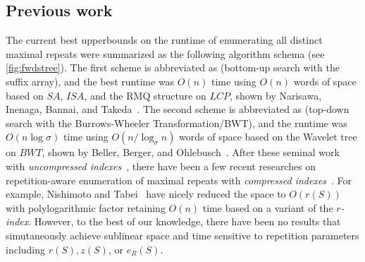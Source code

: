 \subsection{Previous work} 
The current best upperbounds on the runtime of enumerating all distinct  maximal repeats were summarized as the following algorithm schema (see \cref{fig:fwdstree}).
The first scheme is abbreviated as \BUSA{} (bottom-up search with the suffix array),  and the best runtime was $O(n)$ time using $O(n)$ words of space based on $SA$, $ISA$, and the RMQ structure on $LCP$, shown by Narisawa, Inenaga, Bannai, and Takeda~\cite{narisawa2007efficient}. 
The second scheme is abbreviated as \TDBW{} (top-down search with the Burrows-Wheeler Transformation/BWT), and the runtime was $O(n \log\sigma)$ time using $O(n/\log_\sigma n)$ words of space based on the Wavelet tree on $BWT$, shown by Beller, Berger, and Ohlebusch~\cite{beller:berger2012space:efficient:bbo}.
After these seminal work with \textit{uncompressed indexes}~\cite{narisawa2007efficient,beller:berger2012space:efficient:bbo}, there have been a few recent researches on repetition-aware enumeration of maximal repeats with \textit{compressed indexes}~\cite{belazzougui2020linear,nishimoto:cpm2021enum}. For example, Nishimoto and Tabei~\cite{nishimoto:cpm2021enum} have nicely reduced the space to $O(r(S))$ with polylogarithmic factor retaining $O(n)$ time based on a variant of the \textit{$r$-index}. However, to the best of our knowledge, there have been no results that simutaneously achieve sublinear space and time sensitive to repetition parameters including $r(S), z(S)$, or $e_R(S)$. 


